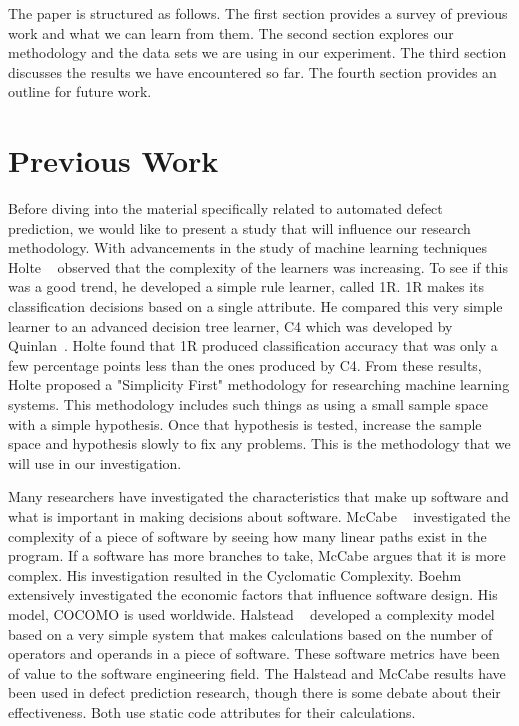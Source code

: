\documentclass{sig-alternate}
\begin{document}
The paper is structured as follows.  The first section provides a survey of previous work and what we can learn from them.  The second section explores our methodology and the data sets we are using in our experiment.
The third section discusses the results we have encountered so far.  The fourth section provides an outline for future work.

\section{Previous Work}

Before diving into the material specifically related to automated defect prediction, we would like to present a study that will influence our research methodology.  With advancements in the study of machine learning
techniques Holte ~\cite{Holte93} observed that the complexity of the learners was increasing.  To see if this was a good trend, he developed a simple rule learner, called 1R.  1R makes its classification decisions based on a single attribute.
He compared this very simple learner to an advanced decision tree learner, C4 which was developed by Quinlan~\cite{Quinlan93}.  Holte found that 1R produced classification accuracy that was only a few percentage points less than
the ones produced by C4.  From these results, Holte proposed a "Simplicity First" methodology for researching machine learning systems.  This methodology includes such things as using a small sample space with a simple hypothesis.  
Once that hypothesis is tested, increase the sample space and hypothesis slowly to fix any problems.  This is the methodology that we will use in our investigation.     

Many researchers have investigated the characteristics that make up software and what is important in making decisions about software.  McCabe ~\cite{McCabe76} investigated the complexity of a piece of software by seeing how many linear paths exist in the program.  If a software has more branches to take, McCabe argues that it is more complex.  His investigation resulted in the Cyclomatic Complexity.  Boehm ~\cite{Boehm81} extensively investigated the economic factors that influence software design.  His model, COCOMO is used worldwide.  Halstead ~\cite{Halstead77} developed a complexity model based on a very simple system that makes calculations based on the number of operators and operands in a piece of software.  These software metrics have been of value to the software engineering field.  The Halstead and McCabe results have been used in defect prediction research, though there is some debate about their effectiveness.  Both use static code attributes for their calculations.  
\end{document}
